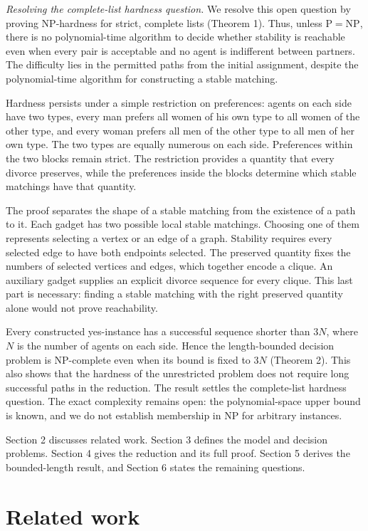 \documentclass[11pt,letterpaper]{article}
\theoremstyle{definition}
\begin{document}
\medskip\noindent\textit{Resolving the complete-list hardness question.}
We resolve this open question by proving NP-hardness for strict, complete lists (Theorem 1). Thus, unless $\mathrm{P}=\mathrm{NP}$, there is no polynomial-time algorithm to decide whether stability is reachable even when every pair is acceptable and no agent is indifferent between partners. The difficulty lies in the permitted paths from the initial assignment, despite the polynomial-time algorithm for constructing a stable matching.

Hardness persists under a simple restriction on preferences: agents on each side have two types, every man prefers all women of his own type to all women of the other type, and every woman prefers all men of the other type to all men of her own type. The two types are equally numerous on each side. Preferences within the two blocks remain strict. The restriction provides a quantity that every divorce preserves, while the preferences inside the blocks determine which stable matchings have that quantity.

The proof separates the shape of a stable matching from the existence of a path to it. Each gadget has two possible local stable matchings. Choosing one of them represents selecting a vertex or an edge of a graph. Stability requires every selected edge to have both endpoints selected. The preserved quantity fixes the numbers of selected vertices and edges, which together encode a clique. An auxiliary gadget supplies an explicit divorce sequence for every clique. This last part is necessary: finding a stable matching with the right preserved quantity alone would not prove reachability.

Every constructed yes-instance has a successful sequence shorter than $3N$, where $N$ is the number of agents on each side. Hence the length-bounded decision problem is NP-complete even when its bound is fixed to $3N$ (Theorem 2). This also shows that the hardness of the unrestricted problem does not require long successful paths in the reduction. The result settles the complete-list hardness question. The exact complexity remains open: the polynomial-space upper bound is known, and we do not establish membership in NP for arbitrary instances.

Section 2 discusses related work. Section 3 defines the model and decision problems. Section 4 gives the reduction and its full proof. Section 5 derives the bounded-length result, and Section 6 states the remaining questions.

\section{Related work}
\end{document}
